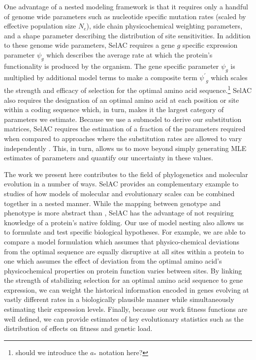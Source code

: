 \documentclass{article}
\newcommand{\Ne}{\ensuremath{{N_e}}\xspace} %
\newcommand{\selac}{SelAC\xspace}
\newcommand{\aopt}{\ensuremath{a_*}\xspace}
\newcommand{\psiprime}{\ensuremath{\psi^\prime}\xspace}
\begin{document}
One advantage of a nested modeling framework is that it requires only a handful of genome wide parameters such as nucleotide specific mutation rates (scaled by effective population size \Ne), side chain physicochemical weighting parameters, and a shape parameter describing the distribution of site sensitivities. %
In addition to these genome wide parameters, \selac requires a gene $g$ specific expression parameter $\psi_g$ which describes the average rate at which the protein's functionality is produced by the organism.
The gene specific parameter $\psi_g$ is multiplied by additional model terms to make a composite term $\psiprime_g$ which scales the strength and efficacy of selection for the optimal amino acid sequence.\footnote{should we introduce the \aopt notation here?}
\selac also requires the designation of an optimal amino acid at each position or site within a coding sequence which, in turn, makes it the largest category of parameters we estimate.
Because we use a submodel to derive our substitution matrices, \selac requires the estimation of a fraction of the parameters required when compared to approaches where the substitution rates are allowed to vary independently \citep{HalpernAndBruno1998,LartillotAndPhilippe2004,RodrigueAndLartillot2014}.
This, in turn, allows us to move beyond simply generating MLE estimates of parameters \citep[c.f.][]{YangAndNielsen2008} and quantify our uncertainty in these values.

The work we present here contributes to the field of phylogenetics and molecular evolution in a number of ways.
\selac provides an complementary example to \citet{ThorneEtAl2012} studies of how models of molecular and evolutionary scales can be combined together in a nested manner.
While the mapping between genotype and phenotype is more abstract than \citet{ThorneEtAl2012}, \selac has the advantage of not requiring knowledge of a protein's native folding.
Our use of model nesting also allows us to formulate and test specific biological hypotheses.
For example, we are able to compare a model formulation which assumes that physico-chemical deviations from the optimal sequence are equally disruptive at all sites within a protein to one which assumes the effect of deviation from the optimal amino acid's physicochemical properties on protein function varies between sites.
By linking the strength of stabilizing selection for an optimal amino acid sequence to gene expression,  we can weight the historical information encoded in genes evolving at vastly different rates in a biologically plausible manner while simultaneously estimating their expression levels.
Finally, because our work fitness functions are well defined, we can provide estimates of key evolutionary statistics such as the distribution of effects on fitness and genetic load.
\end{document}
